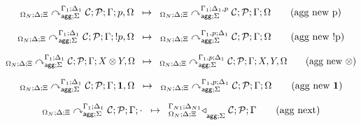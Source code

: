 
\[
\trans{
   \derstatea{\Delta}{\Xi}{\Gamma_1}{\Delta_1}{\Sigma}{\lstack{C};
      \lstack{P}}{p, \Omega}
}
{
   \derstatea{\Delta}{\Xi}{\Gamma_1}{\Delta_1, p}{\Sigma}{\lstack{C};
      \lstack{P}}{\Omega}
} \tag{agg new p}
\]

\[
\trans{
   \derstatea{\Delta}{\Xi}{\Gamma_1}{\Delta_1}{\Sigma}{\lstack{C};
      \lstack{P}}{\bang p, \Omega}
}
{
   \derstatea{\Delta}{\Xi}{\Gamma_1, p}{\Delta_1}{\Sigma}{\lstack{C};
      \lstack{P}}{\Omega}
} \tag{agg new \bang p}
\]

\[
\trans{
   \derstatea{\Delta}{\Xi}{\Gamma_1}{\Delta_1}{\Sigma}{\lstack{C};
      \lstack{P}}{X \otimes Y, \Omega}
}
{
   \derstatea{\Delta}{\Xi}{\Gamma_1, p}{\Delta_1}{\Sigma}{\lstack{C};
      \lstack{P}}{X, Y, \Omega}
} \tag{agg new $\otimes$}
\]

\[
\trans{
   \derstatea{\Delta}{\Xi}{\Gamma_1}{\Delta_1}{\Sigma}{\lstack{C};
      \lstack{P}}{\one, \Omega}
}
{
   \derstatea{\Delta}{\Xi}{\Gamma_1, p}{\Delta_1}{\Sigma}{\lstack{C};
      \lstack{P}}{\Omega}
} \tag{agg new $\one$}
\]

\[
\trans{
   \derstatea{\Delta}{\Xi}{\Gamma_1}{\Delta_1}{\Sigma}{\lstack{C};
      \lstack{P}}{\cdot}
}
{
   \contstatea{\Delta}{\lstack{C} ; \lstack{P}}{\Gamma}{\Sigma}
} \tag{agg next}
\]
